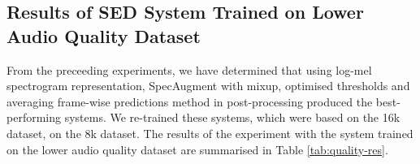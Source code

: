 \subsection{Results of SED System Trained on Lower Audio Quality Dataset}
From the preceeding experiments, we have determined that using log-mel spectrogram representation, SpecAugment with mixup, optimised thresholds and averaging frame-wise predictions method in post-processing produced the best-performing systems. We re-trained these systems, which were based on the 16k dataset, on the 8k dataset. The results of the experiment with the system trained on the lower audio quality dataset are summarised in Table \ref{tab:quality-res}.

\begin{table}[!htp]
\centering
{}
\end{table}
